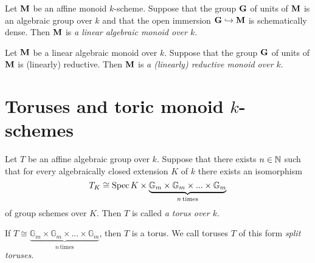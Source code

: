 \begin{definition}
Let $\mathbf{M}$ be an affine monoid $k$-scheme. Suppose that the group $\mathbf{G}$ of units of $\mathbf{M}$ is an algebraic group over $k$ and that the open immersion $\mathbf{G}\hookrightarrow \mathbf{M}$ is schematically dense. Then $\mathbf{M}$ is \textit{a linear algebraic monoid over $k$}.
\end{definition}

\begin{definition}
Let $\mathbf{M}$ be a linear algebraic monoid over $k$. Suppose that the group $\mathbf{G}$ of units of $\mathbf{M}$ is (linearly) reductive. Then $\mathbf{M}$ is \textit{a (linearly) reductive monoid over $k$}.
\end{definition}

\section{Toruses and toric monoid $k$-schemes}

\begin{definition}
Let $T$ be an affine algebraic group over $k$. Suppose that there exists $n\in {\mathbb N}$ such that for every algebraically closed extension $K$ of $k$ there exists an isomorphism
$$T_K \cong  \mathrm{Spec}\, K \times \underbrace{\mathbb{G}_{m}\times \mathbb{G}_{m}\times ...\times \mathbb{G}_{m}}_{n\,\mathrm{times}} $$
of group schemes over $K$. Then $T$ is called \textit{a torus over $k$}.
\end{definition}

\begin{example}\label{example:split_torus}
If $T \cong \underbrace{\mathbb{G}_{m}\times \mathbb{G}_{m}\times ...\times \mathbb{G}_{m}}_{n\,\mathrm{times}}$, then $T$ is a torus. We call toruses $T$ of this form \textit{split toruses}.
\end{example}

